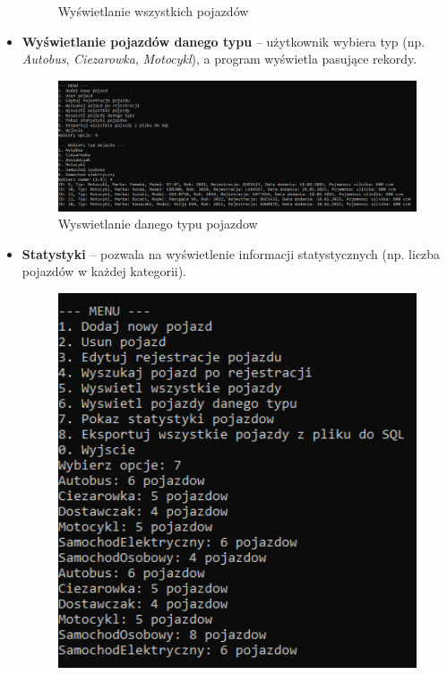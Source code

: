 \begin{itemize}
\begin{figure}[H]
        \caption{Wyświetlanie wszystkich pojazdów}
        \label{fig:moj_obrazek}
    \end{figure}
    \item \textbf{Wyświetlanie pojazdów danego typu} -- użytkownik wybiera typ (np. \textit{Autobus}, 
    \textit{Ciezarowka}, \textit{Motocykl}), a program wyświetla pasujące rekordy.
    \begin{figure}[H] 
        \centering
        \includegraphics[width=1\textwidth]{DanyTyp.png}
        \caption{Wyswietlanie danego typu pojazdow}
        \label{fig:moj_obrazek}
    \end{figure}
    \item \textbf{Statystyki} -- pozwala na wyświetlenie informacji statystycznych (np. liczba pojazdów 
    w każdej kategorii).
    \begin{figure}[H] 
        \centering
        \includegraphics[width=1\textwidth]{Statystyki.png}

\end{figure}
\end{itemize}
